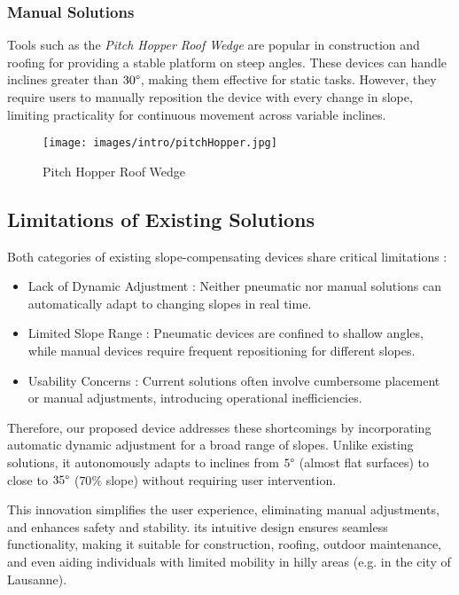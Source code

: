 \documentclass[lettersize,journal]{IEEEtran}
\begin{document}
\subsubsection{Manual Solutions } \textcolor{magenta}{}

Tools such as the \textit{Pitch Hopper Roof Wedge} \cite{ref4} are popular in construction and roofing for providing a stable platform on steep angles. These devices can handle inclines greater than $30\degree$, making them effective for static tasks. However, they require users to manually reposition the device with every change in slope, limiting practicality for continuous movement across variable inclines.

\begin{figure}[ht]
\centering
\texttt{[image: images/intro/pitchHopper.jpg]}
\caption{Pitch Hopper Roof Wedge}
\label{pitchhopper}
\end{figure}

\subsection{Limitations of Existing Solutions}
Both categories of existing slope-compensating devices share critical limitations :

\begin{itemize}
    \item Lack of Dynamic Adjustment : Neither pneumatic nor manual solutions can automatically adapt to changing slopes in real time.

    \item Limited Slope Range : Pneumatic devices are confined to shallow angles, while manual devices require frequent repositioning for different slopes.

    \item Usability Concerns : Current solutions often involve cumbersome placement or manual adjustments, introducing operational inefficiencies.
\end{itemize}


Therefore, our proposed device addresses these shortcomings by incorporating automatic dynamic adjustment for a broad range of slopes. Unlike existing solutions, it autonomously adapts to inclines from $5\degree$ (almost flat surfaces) to close to $35\degree$ ($70\%$ slope) without requiring user intervention.

This innovation simplifies the user experience, eliminating manual adjustments, and enhances safety and stability. its intuitive design ensures seamless functionality, making it suitable for construction, roofing, outdoor maintenance, and even aiding individuals with limited mobility in hilly areas (e.g. in the city of Lausanne).
\end{document}
